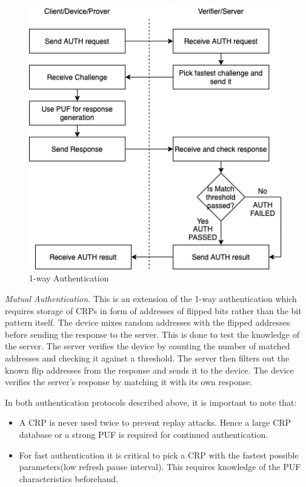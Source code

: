 \documentclass[journal, a4paper]{IEEEtran}
\begin{document}
\begin{figure}[!hbt]
    \begin{center}
    \includegraphics[scale=0.5]{figs/authentication.png}
    \setlength{\belowcaptionskip}{-20pt}
    \caption{1-way Authentication}
    \label{fig:one_way}
    \end{center}
\end{figure}

\textit{Mutual Authentication.} This is an extension of the 1-way authentication which requires storage of CRPs in form of addresses of flipped bits rather than the bit pattern itself. The device mixes random addresses with the flipped addresses before sending the response to the server. This is done to test the knowledge of the server. The server verifies the device by counting the number of matched addresses and checking it against a threshold. The server then filters out the known flip addresses from the response and sends it to the device. The device verifies the server's response by matching it with its own response.

In both authentication protocols described above, it is important to note that:
\begin{itemize}
    \item A CRP is never used twice to prevent replay attacks. Hence a large CRP database or a strong PUF is required for continued authentication.
    \item For fast authentication it is critical to pick a CRP with the fastest possible parameters(low refresh pause interval). This requires knowledge of the PUF characteristics beforehand.
\end{itemize}
\end{document}
